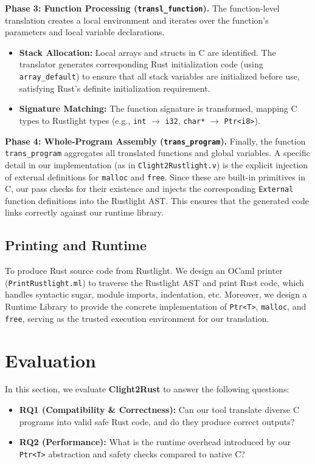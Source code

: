 \documentclass{llncs} %
\begin{document}
\textbf{Phase 3: Function Processing (\texttt{transl\_function}).}
The function-level translation creates a local environment and iterates over the function's parameters and local variable declarations.
\begin{itemize}
    \item \textbf{Stack Allocation:} Local arrays and structs in C are identified. The translator generates corresponding Rust initialization code (using \texttt{array\_default}) to ensure that all stack variables are initialized before use, satisfying Rust's definite initialization requirement.
    \item \textbf{Signature Matching:} The function signature is transformed, mapping C types to Rustlight types (e.g., \texttt{int} $\to$ \texttt{i32}, \texttt{char*} $\to$ \texttt{Ptr<i8>}).
\end{itemize}

\textbf{Phase 4: Whole-Program Assembly (\texttt{trans\_program}).}
Finally, the function \texttt{trans\_program} aggregates all translated functions and global variables.
A specific detail in our implementation (as in \texttt{Clight2Rustlight.v}) is the explicit injection of external definitions for \texttt{malloc} and \texttt{free}. Since these are built-in primitives in C, our pass checks for their existence and injects the corresponding \texttt{External} function definitions into the Rustlight AST. This ensures that the generated code links correctly against our runtime library.

\subsection{Printing and Runtime}
\label{ssec:runtime}
To produce Rust source code from Rustlight. We design an OCaml printer (\texttt{PrintRustlight.ml}) to traverse the Rustlight AST and print Rust code, which handles syntactic sugar, module imports, indentation, etc.
Moreover, we design a Runtime Library to provide the concrete implementation of \texttt{Ptr<T>}, \texttt{malloc}, and \texttt{free}, serving as the trusted execution environment for our translation.


\section{Evaluation}
\label{sec:eval}

In this section, we evaluate \textbf{Clight2Rust} to answer the following questions:
\begin{itemize}
    \item \textbf{RQ1 (Compatibility \& Correctness):} Can our tool translate diverse C programs into valid safe Rust code, and do they produce correct outputs?
    \item \textbf{RQ2 (Performance):} What is the runtime overhead introduced by our \texttt{Ptr<T>} abstraction and safety checks compared to native C?
\end{itemize}
\end{document}
